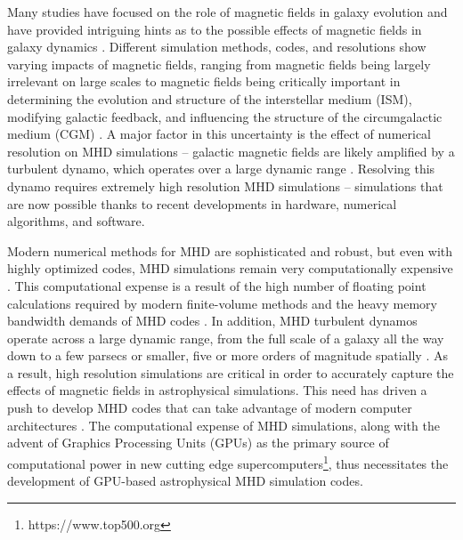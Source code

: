 \documentclass[modern, linenumbers]{aastex631}
\begin{document}
Many studies have focused on the role of magnetic fields in galaxy evolution and have provided intriguing hints as to the possible effects of magnetic fields in galaxy dynamics \citep{shin_2008, banda_2016, grand_auriga_2017, pakmor_magnetic_2017, hopkins_but_2020, wibking_2021}. Different simulation methods, codes, and resolutions show varying impacts of magnetic fields, ranging from magnetic fields being largely irrelevant on large scales to magnetic fields being critically important in determining the evolution and structure of the interstellar medium (ISM), modifying galactic feedback, and influencing the structure of the circumgalactic medium (CGM) \citep{martin-alvarez_how_2020, dobbs_magnetic_2007, kim_vertical_2015, hanasz_global_2009, pakmor_simulations_2013, banda_2017}. A major factor in this uncertainty is the effect of numerical resolution on MHD simulations -- galactic magnetic fields are likely amplified by a turbulent dynamo, which operates over a large dynamic range \citep{martin-alvarez_three-phase_2018, beck_1996, gent_2021, carteret_2022, brandenburg_2023}. Resolving this dynamo requires extremely high resolution MHD simulations -- simulations that are now possible thanks to recent developments in hardware, numerical algorithms, and software.

Modern numerical methods for MHD are sophisticated and robust, but even with highly optimized codes, MHD simulations remain very computationally expensive \citep{athena++_2020}. This computational expense is a result of the high number of floating point calculations required by modern finite-volume methods and the heavy memory bandwidth demands of MHD codes \citep{k_athena_2021}. In addition, MHD turbulent dynamos operate across a large dynamic range, from the full scale of a galaxy all the way down to a few parsecs or smaller, five or more orders of magnitude spatially \citep{pariev_magnetic_1_2007, pariev_magnetic_2_2007, ntormousi_dynamo_2020, galishnikova_tearing_2022}. As a result, high resolution simulations are critical in order to accurately capture the effects of magnetic fields in astrophysical simulations. This need has driven a push to develop MHD codes that can take advantage of modern computer architectures \citep[e.g.][]{schive_gamer-2_2018, almgren_castro_2020, zingale_castro_2020, shankar_gram-x_2022, liska_h-amr_2022, begue_cuharm_2023, holmen_early_2023}. The computational expense of MHD simulations, along with the advent of Graphics Processing Units (GPUs) as the primary source of computational power in new cutting edge supercomputers\footnote{https://www.top500.org}, thus necessitates the development of GPU-based astrophysical MHD simulation codes.
\end{document}
